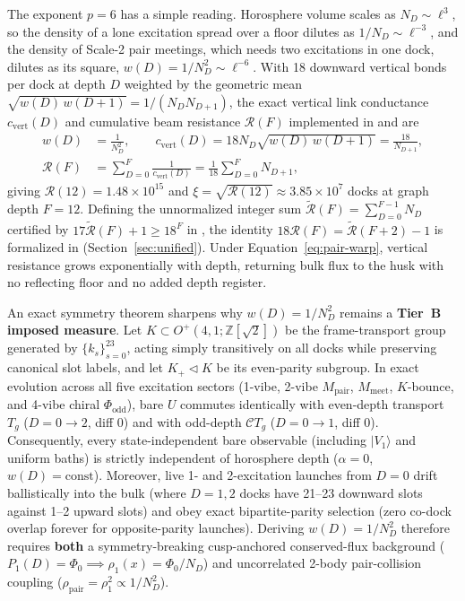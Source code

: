 The exponent $p = 6$ has a simple reading. Horosphere volume scales as $N_D \sim \ell^3$, so the density of a lone
excitation spread over a floor dilutes as $1/N_D \sim \ell^{-3}$, and the density of Scale-2 pair meetings, which needs
two excitations in one dock, dilutes as its square, $w(D) = 1/N_D^2 \sim \ell^{-6}$.
With 18 downward vertical bonds per dock at depth $D$ weighted by the geometric mean
$\sqrt{w(D)\, w(D+1)} = 1/(N_D N_{D+1})$, the exact vertical link conductance $c_{\mathrm{vert}}(D)$ and cumulative
beam resistance $\mathcal{R}(F)$ implemented in  and  are
\begin{equation}
\begin{aligned}
w(D) &= \frac{1}{N_D^2},
\qquad
c_{\mathrm{vert}}(D) = 18 N_D \sqrt{w(D)\, w(D+1)} = \frac{18}{N_{D+1}}, \\
\mathcal{R}(F) &= \sum_{D=0}^{F} \frac{1}{c_{\mathrm{vert}}(D)} = \frac{1}{18} \sum_{D=0}^{F} N_{D+1},
\end{aligned}
\label{eq:pair-warp}
\end{equation}
giving $\mathcal{R}(12) = 1.48 \times 10^{15}$ and $\xi = \sqrt{\mathcal{R}(12)} \approx 3.85 \times 10^7$ docks at
graph depth $F = 12$. Defining the unnormalized integer sum $\tilde{\mathcal{R}}(F) = \sum_{D=0}^{F-1} N_D$ certified
by $17\tilde{\mathcal{R}}(F) + 1 \ge 18^F$ in , the identity
$18\mathcal{R}(F) = \tilde{\mathcal{R}}(F+2) - 1$ is formalized in 
(Section~\ref{sec:unified}). Under Equation~\eqref{eq:pair-warp}, vertical resistance grows exponentially with depth,
returning bulk flux to the husk with no reflecting floor and no added depth register.

An exact symmetry theorem sharpens why $w(D) = 1/N_D^2$ remains a \textbf{Tier~B imposed measure}. Let
$K \subset O^+(4,1; \mathbb{Z}[\sqrt{2}])$ be the frame-transport group generated by $\{k_s\}_{s=0}^{23}$, acting
simply transitively on all docks while preserving canonical slot labels, and let $K_+ \triangleleft K$ be its
even-parity subgroup. In exact  evolution across all five excitation sectors (1-vibe, 2-vibe
$M_{\mathrm{pair}}$, $M_{\mathrm{meet}}$, $K$-bounce, and 4-vibe chiral $\Phi_{\mathrm{odd}}$), bare $U$ commutes
identically with even-depth transport $T_g$ ($D = 0 \to 2$, diff $0$) and with odd-depth $\mathcal{C} T_g$
($D = 0 \to 1$, diff $0$). Consequently, every state-independent bare observable (including $|V_1\rangle$ and uniform
baths) is strictly independent of horosphere depth ($\alpha = 0$, $w(D) = \text{const}$). Moreover, live 
1- and 2-excitation launches from $D = 0$ drift ballistically into the bulk (where $D = 1, 2$ docks have 21--23
downward slots against 1--2 upward slots) and obey exact bipartite-parity selection (zero co-dock overlap forever for
opposite-parity launches). Deriving $w(D) = 1/N_D^2$ therefore requires \textbf{both} a symmetry-breaking
cusp-anchored conserved-flux background ($P_1(D) = \Phi_0 \implies \rho_1(x) = \Phi_0 / N_D$) and uncorrelated 2-body
pair-collision coupling ($\rho_{\mathrm{pair}} = \rho_1^2 \propto 1/N_D^2$).

